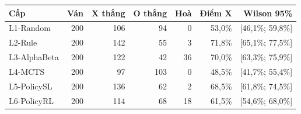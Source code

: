 \begin{center}\small
\begin{tabular}{@{}lrrrrrr@{}}
\toprule
Cấp & Ván & X thắng & O thắng & Hoà & Điểm X & Wilson 95\% \\
\midrule
L1-Random & 200 & 106 & 94 & 0 & 53,0\% & [46,1\%; 59,8\%] \\
L2-Rule & 200 & 142 & 55 & 3 & 71,8\% & [65,1\%; 77,5\%] \\
L3-AlphaBeta & 200 & 122 & 42 & 36 & 70,0\% & [63,3\%; 75,9\%] \\
L4-MCTS & 200 & 97 & 103 & 0 & 48,5\% & [41,7\%; 55,4\%] \\
L5-PolicySL & 200 & 136 & 62 & 2 & 68,5\% & [61,8\%; 74,5\%] \\
L6-PolicyRL & 200 & 114 & 68 & 18 & 61,5\% & [54,6\%; 68,0\%] \\
\bottomrule
\end{tabular}
\end{center}